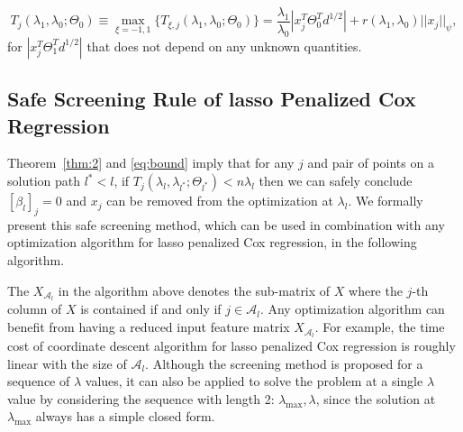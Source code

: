 \begin{equation}
    \label{eq:bound}
    T_j(\lambda_1,\lambda_0;\Theta_{0})\equiv\max_{\xi=-1,1}\{T_{\xi,j}(\lambda_1,\lambda_0;\Theta_{0})\}=\frac{\lambda_1}{\lambda_0}\left| x_j^T\Theta_{0}^Td^{1/2}\right|+r(\lambda_1,\lambda_0)||x_j||_\psi,
\end{equation}
for $|x_j^T\Theta^T_{1}d^{1/2}|$ that does not depend on any unknown quantities. 

\subsection{Safe Screening Rule of lasso Penalized Cox Regression}

Theorem~\ref{thm:2} and \eqref{eq:bound} imply that for any $j$ and pair of points on a solution path $l^*<l$, if $T_j(\lambda_{l},\lambda_{l^*};\Theta_{l^*})<n\lambda_l$ then we can safely conclude $[\beta_l]_{j}=0$ and $x_j$ can be removed from the optimization at $\lambda_l$. We formally present this safe screening method, which can be used in combination with any optimization algorithm for lasso penalized Cox regression, in the following algorithm.

\begin{algorithm}[H]

    
\end{algorithm}

The $X_{\mathcal{A}_l}$ in the algorithm above denotes the sub-matrix of $X$ where the $j$-th column of $X$ is contained if and only if $j\in{\mathcal{A}_l}$. Any optimization algorithm can benefit from having a reduced input feature matrix $X_{\mathcal{A}_l}$. For example, the time cost of coordinate descent algorithm for lasso penalized Cox regression \citep{simon2011regularization} is roughly linear with the size of $\mathcal{A}_l$. Although the screening method is proposed for a sequence of $\lambda$ values, it can also be applied to solve the problem at a single $\lambda$ value by considering the sequence with length 2: $\lambda_{\max},\lambda$, since the solution at $\lambda_{\max}$ always has a simple closed form.

